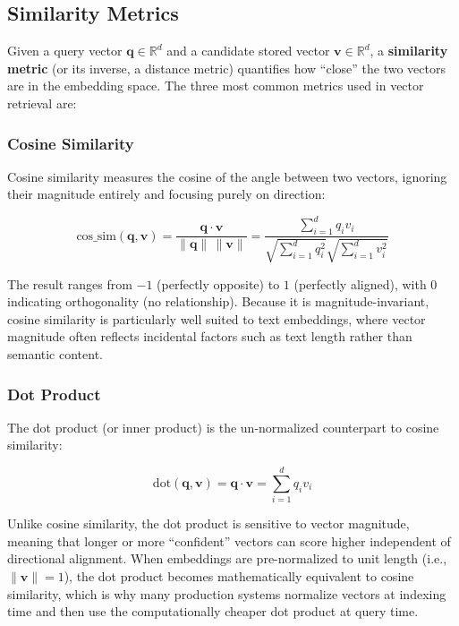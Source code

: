 \documentclass[11pt,a4paper]{article}
\begin{document}
\subsection{Similarity Metrics}

Given a query vector $\mathbf{q} \in \mathbb{R}^d$ and a candidate stored vector $\mathbf{v} \in \mathbb{R}^d$, a \textbf{similarity metric} (or its inverse, a distance metric) quantifies how ``close'' the two vectors are in the embedding space. The three most common metrics used in vector retrieval are:

\subsubsection{Cosine Similarity}

Cosine similarity measures the cosine of the angle between two vectors, ignoring their magnitude entirely and focusing purely on direction:

\begin{equation}
\text{cos\_sim}(\mathbf{q}, \mathbf{v}) = \frac{\mathbf{q} \cdot \mathbf{v}}{\lVert \mathbf{q} \rVert \, \lVert \mathbf{v} \rVert} = \frac{\sum_{i=1}^{d} q_i v_i}{\sqrt{\sum_{i=1}^{d} q_i^2}\sqrt{\sum_{i=1}^{d} v_i^2}}
\end{equation}

The result ranges from $-1$ (perfectly opposite) to $1$ (perfectly aligned), with $0$ indicating orthogonality (no relationship). Because it is magnitude-invariant, cosine similarity is particularly well suited to text embeddings, where vector magnitude often reflects incidental factors such as text length rather than semantic content.

\subsubsection{Dot Product}

The dot product (or inner product) is the un-normalized counterpart to cosine similarity:

\begin{equation}
\text{dot}(\mathbf{q}, \mathbf{v}) = \mathbf{q} \cdot \mathbf{v} = \sum_{i=1}^{d} q_i v_i
\end{equation}

Unlike cosine similarity, the dot product is sensitive to vector magnitude, meaning that longer or more ``confident'' vectors can score higher independent of directional alignment. When embeddings are pre-normalized to unit length (i.e., $\lVert \mathbf{v} \rVert = 1$), the dot product becomes mathematically equivalent to cosine similarity, which is why many production systems normalize vectors at indexing time and then use the computationally cheaper dot product at query time.
\end{document}
